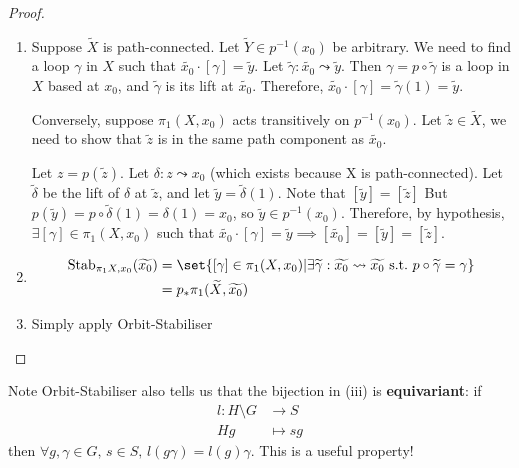 \documentclass{article}
\numberwithin{nthm}{subsection}
\begin{document}
\begin{proof}
    \begin{enumerate}[label=(\roman*)]
        \item
            Suppose $\widetilde{X}$ is path-connected.
            Let $\widetilde{Y} \in p^{-1}(x_0)$ be arbitrary. We need to find a loop $\gamma$ in $X$ such that $\widetilde{x_0} \cdot [\gamma] = \widetilde{y}$.
            Let $\widetilde{\gamma} : \widetilde{x_0} \leadsto \widetilde{y}$.
            Then $\gamma = p \circ \widetilde{\gamma}$ is a loop in $X$ based at $x_0$, and $\widetilde{\gamma}$ is its lift at $\widetilde{x_0}$.
            Therefore, $\widetilde{x_0} \cdot [\gamma] = \widetilde{\gamma} (1) = \widetilde{y}$.

            Conversely, suppose $\pi_1(X, x_0)$ acts transitively on $p^{-1}(x_0)$. Let $\widetilde{z} \in \widetilde{X}$, we need to show that $\widetilde{z}$ is in the same path component as $\widetilde{x_0}$.

            Let $z = p(\widetilde{z})$. Let $\delta: z \leadsto x_0$ (which exists because X is path-connected).
            Let $\widetilde{\delta}$ be the lift of $\delta$ at $\widetilde{z}$, and let $\widetilde{y} = \widetilde{\delta}(1)$. Note that $[\widetilde y] = [\widetilde z]$
            But $p(\widetilde{y}) = p \circ \widetilde{\delta}(1) = \delta(1) = x_0$, so $\widetilde{y} \in p^{-1}(x_0)$.
            Therefore, by hypothesis, $\exists[\gamma] \in \pi_1(X, x_0)$ such that $\widetilde{x_0} \cdot [\gamma] = \widetilde{y} \implies [\widetilde{x_0}] = [\widetilde{y}] = [\widetilde{z}]$.
        \item
            \begin{align*}
                \mathrm{Stab}_{\pi_1{X, x_0}} (\widetilde{x_0}) &= \set{[\gamma] \in \pi_1(X, x_0) | \exists \widetilde{\gamma}: \widetilde{x_0} \leadsto \widetilde{x_0} \ \text{s.t.} \ p \circ \widetilde{\gamma} = \gamma} \\
                                                        &= p_* \pi_1(\widetilde{X}, \widetilde{x_0})
            \end{align*}
        \item Simply apply Orbit-Stabiliser
    \end{enumerate}
\end{proof}

Note Orbit-Stabiliser also tells us that the bijection in (iii) is \textbf{equivariant}:
if
\begin{align*}
    l: H \setminus G &\longrightarrow S \\
    Hg &\longmapsto sg
\end{align*}
then $\forall g, \gamma \in G, \, s \in S, \, l(g \gamma) = l(g) \gamma$. This is a useful property!
\end{document}
